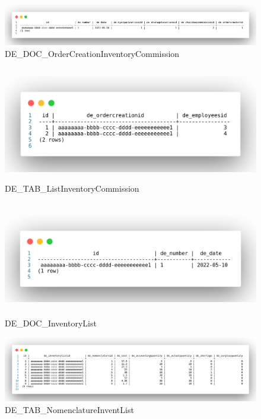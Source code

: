 \begin{figure}[!h]
    \centering

    \includegraphics[width=18cm]
    {assets/sql/DE_DOC_OrderCreationInventoryCommission.png}

    \caption{DE\_DOC\_OrderCreationInventoryCommission}

    \label{fig:DOC_PrilazSozdInventKomis}
\end{figure}

\begin{figure}[!h]
    \centering

    \includegraphics[height=5cm]
    {assets/sql/DE_TAB_ListInventoryCommission.png}

    \caption{DE\_TAB\_ListInventoryCommission}

    \label{fig:TAB_SpisokInventKomis}
\end{figure}

\begin{figure}[!h]
    \centering

    \includegraphics[height=5cm]
    {assets/sql/DE_DOC_InventoryList.png}

    \caption{DE\_DOC\_InventoryList}

    \label{fig:DOC_InventOpis}
\end{figure}

\begin{figure}[!h]
    \centering

    \includegraphics[width=18cm]
    {assets/sql/DE_TAB_NomenclatureInventList.png}

    \caption{DE\_TAB\_NomenclatureInventList}

    \label{fig:TAB_SpisokNomenklInventOpisi}
\end{figure}
